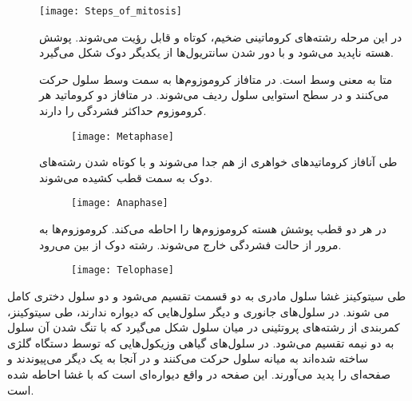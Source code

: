 \begin{figure}[h]
	\centering 
	\texttt{[image: Steps\_of\_mitosis]}
\end{figure}

\begin{description}
\item[]
در این مرحله رشته‌های کروماتینی ضخیم، کوتاه و قابل رؤیت می‌شوند. پوشش هسته ناپدید می‌شود و با دور شدن سانتریول‌ها از یکدیگر دوک شکل می‌گیرد.

\begin{figure}[h]
	\centering
\end{figure}

\pagebreak
\item[]
متا به معنی وسط است.
در متافاز کروموزوم‌ها به سمت وسط سلول حرکت می‌کنند و در سطح استوایی سلول ردیف می‌شوند. در متافاز دو کروماتید هر کروموزوم حداکثر فشردگی را دارند.

\begin{figure}[h]
	\centering
	\texttt{[image: Metaphase]}
\end{figure}

\item[]
طی آنافاز کروماتید‌های خواهری از هم جدا می‌شوند و با کوتاه شدن رشته‌های دوک به سمت قطب کشیده می‌شوند.

\begin{figure}[h]
	\centering
	\texttt{[image: Anaphase]}
\end{figure}

\item[]
در هر دو قطب پوشش هسته کروموزوم‌ها را احاطه می‌کند. کروموزوم‌ها به مرور از حالت فشردگی خارج می‌شوند. رشته دوک از بین می‌رود. 

\begin{figure}[h]
	\centering
	\texttt{[image: Telophase]}
\end{figure}

\end{description}

\pagebreak
طی سیتوکینز غشا سلول مادری به دو قسمت تقسیم می‌شود و دو سلول دختری کامل می شوند. در سلول‌های جانوری و دیگر سلول‌هایی که دیواره ندارند، طی سیتوکینز، کمربندی از رشته‌های پروتئینی در میان سلول شکل می‌گیرد که با تنگ شدن آن سلول به دو نیمه تقسیم می‌شود. در سلول‌های گیاهی وزیکول‌هایی که توسط دستگاه گلژی ساخته شده‌اند به میانه سلول حرکت می‌کنند و در آنجا به یک دیگر می‌پیوندند و صفحه‌ای را پدید می‌آورند. این صفحه در واقع دیواره‌ای است که با غشا احاطه شده است.

